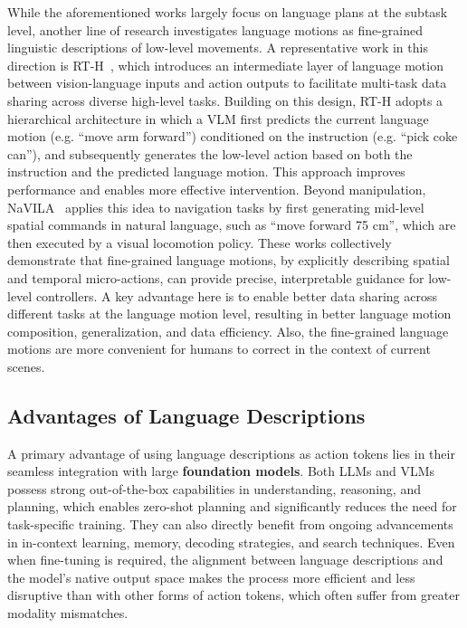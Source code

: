 \documentclass[10pt, a4paper, logo, copyright]{googledeepmind} %
\begin{document}
While the aforementioned works largely focus on language plans at the subtask level, another line of research investigates language motions as fine-grained linguistic descriptions of low-level movements.
A representative work in this direction is RT-H~\cite{rth2024arxiv}, which introduces an intermediate layer of language motion between vision-language inputs and action outputs to facilitate multi-task data sharing across diverse high-level tasks. Building on this design, RT-H adopts a hierarchical architecture in which a VLM first predicts the current language motion (e.g. ``move arm forward'') conditioned on the instruction (e.g. ``pick coke can''), and subsequently generates the low-level action based on both the instruction and the predicted language motion. This approach improves performance and enables more effective intervention.
Beyond manipulation, NaVILA~\cite{cheng2024navila} applies this idea to navigation tasks by first generating mid-level spatial commands in natural language, such as “move forward 75 cm”, which are then executed by a visual locomotion policy.
These works collectively demonstrate that fine-grained language motions, by explicitly describing spatial and temporal micro-actions, can provide precise, interpretable guidance for low-level controllers.
A key advantage here is to enable better data sharing across different tasks at the language motion level, resulting in better language motion composition, generalization, and data efficiency. Also, the fine-grained language motions are more convenient for humans to correct in the context of current scenes.

\subsection{Advantages of Language Descriptions}


A primary advantage of using language descriptions as action tokens lies in their seamless integration with large \textbf{foundation models}. Both LLMs and VLMs possess strong out-of-the-box capabilities in understanding, reasoning, and planning, which enables zero-shot planning and significantly reduces the need for task-specific training. They can also directly benefit from ongoing advancements in in-context learning, memory, decoding strategies, and search techniques. Even when fine-tuning is required, the alignment between language descriptions and the model's native output space makes the process more efficient and less disruptive than with other forms of action tokens, which often suffer from greater modality mismatches.
\end{document}

